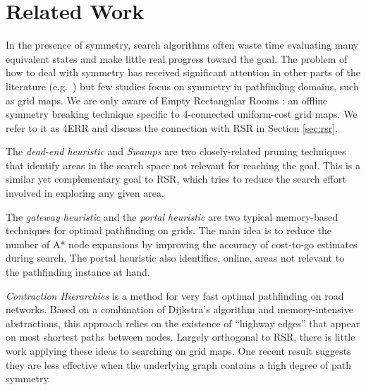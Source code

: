 \section{Related Work}
\label{sec:relatedwork}
In the presence of symmetry, search algorithms often
waste time evaluating many equivalent states and make little real progress toward the goal.
The problem of how to deal with symmetry has received significant attention
in other parts of the literature (e.g.~\cite{rossi06}) but few studies
focus on symmetry in pathfinding domains, such as grid maps.
We are only aware of Empty Rectangular Rooms \cite{harabor10}: an offline symmetry 
breaking technique specific to 4-connected uniform-cost grid maps. We refer to
it as 4ERR and discuss the connection with RSR in Section \ref{sec:rsr}.
\par
The \emph{dead-end heuristic} \cite{bjornsson06} and \emph{Swamps} \cite{pochter10} 
are two closely-related pruning techniques
that identify areas in the search space not relevant for reaching the goal. 
This is a similar yet complementary goal
to RSR, which tries to reduce the search effort involved in exploring any given
area. 
\par
The \emph{gateway heuristic} \cite{bjornsson06} and the \emph{portal heuristic}
\cite{goldenberg10} are two typical memory-based techniques for optimal 
pathfinding on grids. 
The main idea is to reduce the number of
A* node expansions by improving the accuracy of cost-to-go estimates during
search.  The portal heuristic also identifies, online, areas
not relevant to the pathfinding instance at hand.
\par
\emph{Contraction Hierarchies} \cite{geisberger08} is a method for
very fast optimal pathfinding on road networks. 
Based on a combination of Dijkstra's algorithm and memory-intensive
abstractions, this approach relies on the existence of ``highway edges'' that appear
on most shortest paths between nodes.
Largely orthogonal to RSR, there is little work applying these ideas to searching on grid maps.
One recent result \cite{sturtevant10} suggests they are less effective when the 
underlying graph contains a high degree of path
symmetry.
